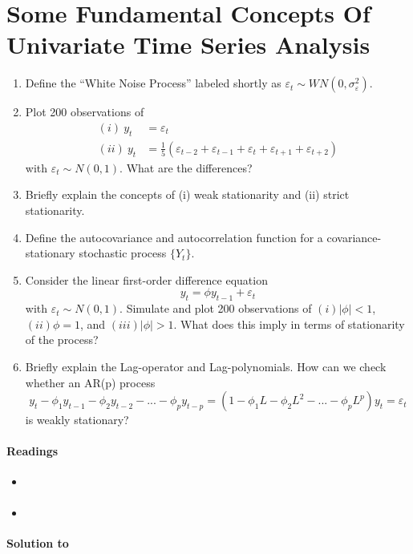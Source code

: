 \section[Some Fundamental Concepts Of Univariate Time Series Analysis]{Some Fundamental Concepts Of Univariate Time Series Analysis\label{ex:FundamentalConceptsUnivariateTimeSeriesAnalysis}}

\begin{enumerate}
	\item Define the \enquote{White Noise Process} labeled shortly as $\varepsilon_t \sim WN(0,\sigma_\varepsilon^2)$.
	\item Plot 200 observations of 
	\begin{align*} 
		   (i)~y_t  &= \varepsilon_t
		\\ (ii)~y_t &= \frac{1}{5}(\varepsilon_{t-2}+\varepsilon_{t-1}+\varepsilon_{t}+\varepsilon_{t+1}+\varepsilon_{t+2})
	\end{align*} 
	with $\varepsilon_{t} \sim N(0,1)$. What are the differences?	
	\item Briefly explain the concepts of (i) weak stationarity and (ii) strict stationarity.
	\item Define the autocovariance and autocorrelation function for a covariance-stationary stochastic process $\{Y_t\}$.
	\item Consider the linear first-order difference equation $$y_t=\phi y_{t-1}+\varepsilon_t$$ with $\varepsilon_{t} \sim N(0,1)$. Simulate and plot 200 observations of $(i) |\phi|<1$, $(ii) \phi=1$, and $(iii) |\phi| >1$. What does this imply in terms of stationarity of the process?
	\item Briefly explain the Lag-operator and Lag-polynomials. How can we check whether an AR(p) process $$y_t - \phi_1 y_{t-1} -\phi_2 y_{t-2} - ... - \phi_p y_{t-p} = (1-\phi_1 L-\phi_2 L^2 -... - \phi_p L^p)y_t = \varepsilon_t$$ is weakly stationary?
\end{enumerate}

\paragraph{Readings}
\begin{itemize}
	\item \textcite[Ch.2]{Bjornland.Thorsrud_2015_AppliedTimeSeries}	
	\item \textcite{Lutkepohl_2004_UnivariateTimeSeries}	
\end{itemize}

\begin{solution}\textbf{Solution to }
\ifDisplaySolutions

\fi
\newpage
\end{solution}